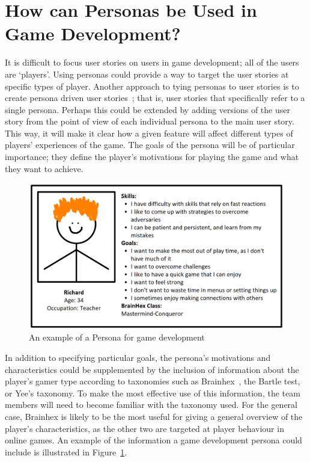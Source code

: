 \documentclass{scrartcl}
\begin{document}
\section{How can Personas be Used in Game Development?}
It is difficult to focus user stories on users in game development; all of the users are `players'. Using personas could provide a way to target the user stories at specific types of player. 
Another approach to tying personas to user stories is to create persona driven user stories~\cite{winter:vision}; that is, user stories that specifically refer to a single persona. Perhaps this could be extended by adding versions of the user story from the point of view of each individual persona to the main user story. This way, it will make it clear how a given feature will affect different types of players' experiences of the game. The goals of the persona will be of particular importance; they define the player's motivations for playing the game and what they want to achieve. 
\begin{figure}[h]
\includegraphics[width=\textwidth]{example.png}
\caption{An example of a Persona for game development}
\label{fig:persona_example}
\end{figure} 

In addition to specifying particular goals, the persona's motivations and characteristics could be supplemented by the inclusion of information about the player's gamer type according to taxonomies such as Brainhex~\cite{nacke:brainhex}, the Bartle test\cite{bartle:mud}, or Yee's taxonomy\cite{yee:online}. To make the most effective use of this information, the team members will need to become familiar with the taxonomy used. For the general case, Brainhex is likely to be the most useful for giving a general overview of the player's characteristics, as the other two are targeted at player behaviour in online games. An example of the information a game development persona could include is illustrated in Figure~\ref{fig:persona_example}. 
\end{document}

